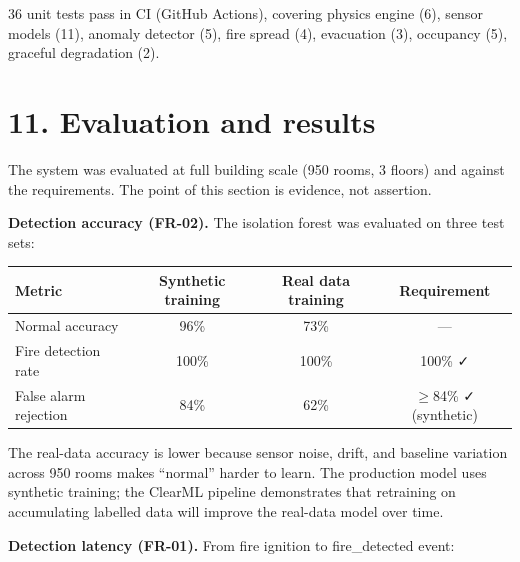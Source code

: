 \documentclass[11pt]{article}
\begin{document}
36 unit tests pass in CI (GitHub Actions), covering physics engine (6), sensor models (11), anomaly detector (5), fire spread (4), evacuation (3), occupancy (5), graceful degradation (2).


\section{11. Evaluation and results}

The system was evaluated at full building scale (950 rooms, 3 floors) and against the requirements. The point of this section is evidence, not assertion.

\textbf{Detection accuracy (FR-02).} The isolation forest was evaluated on three test sets:

\begin{center}
\begin{tabular}{lccc}
\toprule
\textbf{Metric} & \textbf{Synthetic training} & \textbf{Real data training} & \textbf{Requirement} \\
\midrule
Normal accuracy & 96\% & 73\% & --- \\
Fire detection rate & 100\% & 100\% & 100\% ✓ \\
False alarm rejection & 84\% & 62\% & $\geq$84\% ✓ (synthetic) \\
\bottomrule
\end{tabular}
\end{center}

The real-data accuracy is lower because sensor noise, drift, and baseline variation across 950 rooms makes ``normal'' harder to learn. The production model uses synthetic training; the ClearML pipeline demonstrates that retraining on accumulating labelled data will improve the real-data model over time.

\textbf{Detection latency (FR-01).} From fire ignition to fire\_detected event:

\begin{center}
\end{center}
\end{document}
